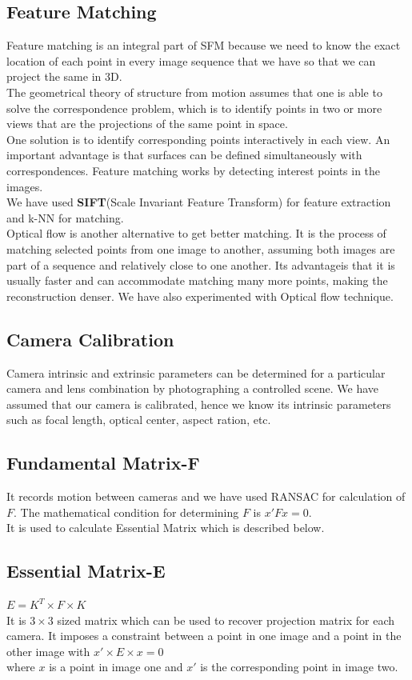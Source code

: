 \documentclass{article}
\begin{document}
\subsection{Feature Matching}
Feature matching is an integral part of SFM because we need to know the exact location of each point in every image sequence that we have so that we can project the same in 3D.\\
The geometrical theory of structure from motion assumes that one is able to solve the correspondence problem, which is to identify points in two or more views that are the projections of the same point in space.\\
One solution is to identify corresponding points interactively in each view. An important advantage is that surfaces can be defined simultaneously with correspondences. Feature matching works by detecting interest points in the images.\\
We have used \textbf{SIFT}(Scale Invariant Feature Transform) for feature extraction and k-NN for matching.\\
Optical flow is another alternative to get better matching. It is the process of matching selected points from one image to another, assuming both images are part of a sequence and relatively close to one another. Its advantageis that it is usually faster and can accommodate matching many more points, making the reconstruction denser. We have also experimented with Optical flow technique.

\subsection{Camera Calibration}
Camera intrinsic and extrinsic parameters can be determined for a particular camera and lens combination by photographing a controlled scene. We have assumed that our camera is calibrated, hence we know its intrinsic parameters such as focal length, optical center, aspect ration, etc.

\subsection{Fundamental Matrix-F}
It records motion between cameras and we have used RANSAC for calculation of $F$. The mathematical condition for determining $F$ is $x'Fx=0$.\\
It is used to calculate Essential Matrix which is described below.

\subsection{Essential Matrix-E}
$E=K^T \times F \times K$\\
It is $3 \times 3$ sized matrix which can be used to recover projection matrix for each camera. It imposes a constraint between a point in one image and a point in the other image with $x' \times E \times x=0$\\
where $x$ is a point in image one and $x'$ is the corresponding point in image two.
\end{document}
